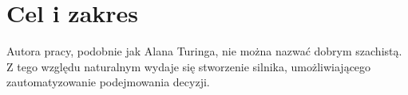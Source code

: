 \section{Cel i zakres}
\label{sec:cel-i-zakres}

Autora pracy, podobnie jak Alana Turinga, nie można nazwać dobrym szachistą.
Z tego względu naturalnym wydaje się stworzenie silnika, umożliwiającego zautomatyzowanie podejmowania decyzji.
